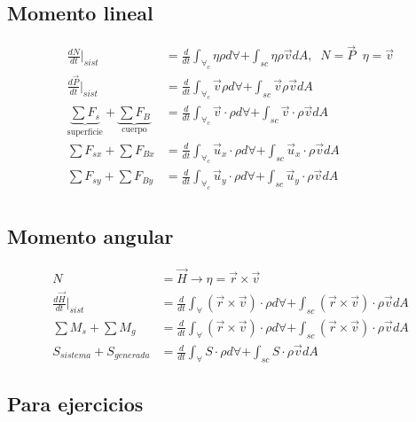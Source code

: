 \subsection{Momento lineal}
\[
    \begin{split}
        \frac{ dN }{ dt }\Big|_{sist} & = \frac{ d }{ dt } \int_{ \forall_{c} } \eta \rho d\forall + \int_{sc} \eta \rho \Vec{v} dA, \;\; N = \Vec{P} \;\; \eta = \Vec{v} \\
        \frac{ d\Vec{P} }{ dt }\Big|_{sist} & = \frac{ d }{ dt } \int_{ \forall_{c} } \Vec{v} \rho d\forall + \int_{sc} \Vec{v} \rho \Vec{v} dA \\
        \underbrace{ \sum F_{s} }_{ \text{superficie} } + \underbrace{ \sum F_{B} }_{ \text{cuerpo} } & = \frac{ d }{ dt } \int_{ \forall_{c} } \Vec{v} \cdot \rho d\forall + \int_{sc} \Vec{v} \cdot \rho \Vec{v} dA \\
        \sum F_{sx} + \sum F_{Bx} & = \frac{ d }{ dt } \int_{\forall_{c}} \Vec{u}_{x} \cdot \rho d\forall + \int_{sc} \Vec{u}_{x} \cdot \rho \Vec{v} dA \\
        \sum F_{sy} + \sum F_{By} & = \frac{ d }{ dt } \int_{\forall_{c}} \Vec{u}_{y} \cdot \rho d\forall + \int_{sc} \Vec{u}_{y} \cdot \rho \Vec{v} dA \\
    \end{split}
\]

\subsection{Momento angular}

\[
    \begin{split}
        N & = \Vec{ H } \to  \eta = \Vec{ r } \times \Vec{ v } \\
        \frac{ d\Vec{ H } }{ dt } \Big|_{sist} & = \frac{ d }{ dt } \int_{ \forall } (\Vec{r} \times \Vec{v} ) \cdot \rho d\forall + \int_{sc} (\Vec{r} \times \Vec{v} ) \cdot \rho \Vec{v} dA \\
        \sum M_{s} + \sum M_{g} & = \frac{ d }{ dt } \int_{ \forall } (\Vec{r} \times \Vec{v} ) \cdot \rho d\forall + \int_{sc} (\Vec{r} \times \Vec{v} ) \cdot \rho \Vec{v} dA \\
        S_{sistema} + S_{generada} & = \frac{ d }{ dt } \int_{ \forall } S \cdot \rho d\forall + \int_{sc} S \cdot \rho \Vec{v} dA
    \end{split}
\]

\subsection{Para ejercicios}

